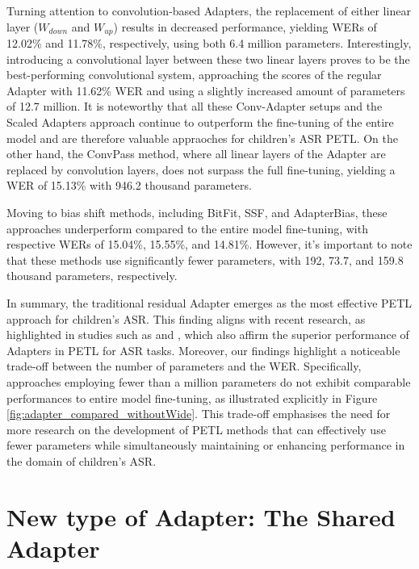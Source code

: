 Turning attention to convolution-based Adapters, the replacement of either linear layer ($W_{down}$ and $W_{up}$) results in decreased performance, yielding WERs of 12.02\% and 11.78\%, respectively, using both 6.4 million parameters. Interestingly, introducing a convolutional layer between these two linear layers proves to be the best-performing convolutional system, approaching the scores of the regular Adapter with 11.62\% WER and using a slightly increased amount of parameters of 12.7 million. It is noteworthy that all these Conv-Adapter setups and the Scaled Adapters approach continue to outperform the fine-tuning of the entire model and are therefore valuable appraoches for children's ASR PETL.
On the other hand, the ConvPass method, where all linear layers of the Adapter are replaced by convolution layers, does not surpass the full fine-tuning, yielding a WER of 15.13\% with 946.2 thousand parameters.

Moving to bias shift methods, including BitFit, SSF, and AdapterBias, these approaches underperform compared to the entire model fine-tuning, with respective WERs of 15.04\%, 15.55\%, and 14.81\%. However, it's important to note that these methods use significantly fewer parameters, with 192, 73.7, and 159.8 thousand parameters, respectively.

In summary, the traditional residual Adapter emerges as the most effective PETL approach for children's ASR. This finding aligns with recent research, as highlighted in studies such as \cite{li2023evaluating} and \cite{cappellazzo2023parameter}, which also affirm the superior performance of Adapters in PETL for ASR tasks. Moreover, our findings highlight a noticeable trade-off between the number of parameters and the WER. Specifically, approaches employing fewer than a million parameters do not exhibit comparable performances to entire model fine-tuning, as illustrated explicitly in Figure \ref{fig:adapter_compared_withoutWide}. This trade-off emphasises the need for more research on the development of PETL methods that can effectively use fewer parameters while simultaneously maintaining or enhancing performance in the domain of children's ASR.

\section{New type of Adapter: The Shared Adapter}

